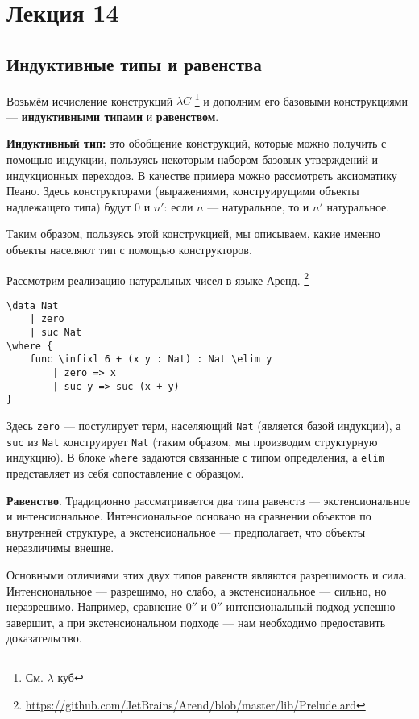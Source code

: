 \section{Лекция 14}

\newcommand{\ard}[1]{\texttt{#1}}

\subsection{Индуктивные типы и равенства}

Возьмём исчисление конструкций $\lambda C$ \footnote{См. $\lambda$-куб} и дополним его базовыми конструкциями --- \textbf{индуктивными типами} и \textbf{равенством}.

\medskip
\textbf{Индуктивный тип:} это обобщение конструкций, которые можно получить с помощью индукции,
пользуясь некоторым набором базовых утверждений и индукционных переходов. В качестве примера можно рассмотреть аксиоматику Пеано.
Здесь конструкторами (выражениями, конструирущими объекты надлежащего типа) будут $0$ и $n'$: если $n$ --- натуральное, то и $n'$ натуральное.

Таким образом, пользуясь этой конструкцией, мы описываем, какие именно объекты населяют тип с помощью конструкторов.

Рассмотрим реализацию натуральных чисел в языке Аренд. \footnote{\url{https://github.com/JetBrains/Arend/blob/master/lib/Prelude.ard}}
\begin{verbatim}
\data Nat
    | zero
    | suc Nat
\where {
    func \infixl 6 + (x y : Nat) : Nat \elim y
        | zero => x
        | suc y => suc (x + y)
}
\end{verbatim}

Здесь \ard{zero} --- постулирует терм, населяющий \ard{Nat} (является базой индукции), а \ard{suc} из \ard{Nat} конструирует \ard{Nat} (таким образом, мы производим структурную индукцию).
В блоке \ard{where} задаются связанные с типом определения, а \ard{elim} представляет из себя сопоставление с образцом.

\medskip
\textbf{Равенство}. Традиционно рассматривается два типа равенств --- экстенсиональное и интенсиональное.
Интенсиональное основано на сравнении объектов по внутренней структуре, а экстенсиональное --- предполагает, что объекты неразличимы внешне.

Основными отличиями этих двух типов равенств являются разрешимость и сила. Интенсиональное --- разрешимо, но слабо, а экстенсиональное --- сильно, но неразрешимо.
Например, сравнение $0''$ и $0''$ интенсиональный подход успешно завершит, а при экстенсиональном подходе --- нам необходимо предоставить доказательство.

